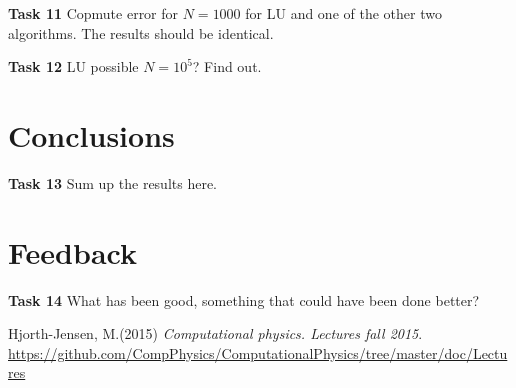 \documentclass{article}
\begin{document}
\textbf{Task 11} Copmute error for $N=1000$ for LU and one of the other two algorithms. The results should be identical.

\textbf{Task 12} LU possible $N=10^5$? Find out.

\section{Conclusions}
\textbf{Task 13} Sum up the results here.

\section{Feedback}
\textbf{Task 14} What has been good, something that could have been done better?

\begin{thebibliography}{9}
	Hjorth-Jensen, M.(2015)
	\textit{Computational physics. Lectures fall 2015}. 
	\url{https://github.com/CompPhysics/ComputationalPhysics/tree/master/doc/Lectures}
\end{thebibliography}
\end{document}
